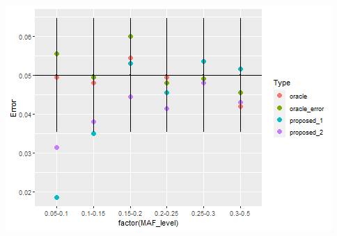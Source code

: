 \documentclass[
]{article}
\newenvironment{Shaded}{\begin{snugshade}}{\end{snugshade}}
\newcommand{\DataTypeTok}[1]{\textcolor[rgb]{0.13,0.29,0.53}{#1}}
\newcommand{\DecValTok}[1]{\textcolor[rgb]{0.00,0.00,0.81}{#1}}
\newcommand{\FloatTok}[1]{\textcolor[rgb]{0.00,0.00,0.81}{#1}}
\newcommand{\KeywordTok}[1]{\textcolor[rgb]{0.13,0.29,0.53}{\textbf{#1}}}
\newcommand{\NormalTok}[1]{#1}
\newcommand{\OperatorTok}[1]{\textcolor[rgb]{0.81,0.36,0.00}{\textbf{#1}}}
\newcommand{\StringTok}[1]{\textcolor[rgb]{0.31,0.60,0.02}{#1}}
\begin{document}
\begin{Shaded}
\begin{Highlighting}[]
{{\NormalTok{all_error }\OperatorTok{%
\end{Highlighting}
\end{Shaded}

\includegraphics{stats-gene-research-progress-v9_files/figure-latex/unnamed-chunk-11-1.png}
\end{document}
